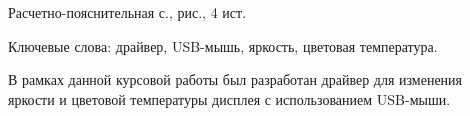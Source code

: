 
Расчетно-пояснительная \pageref{TotPages} с., \totalfigures{} рис., 4 ист.

Ключевые слова: драйвер, USB-мышь, яркость, цветовая температура.

В рамках данной курсовой работы был разработан драйвер для изменения яркости и цветовой температуры дисплея с использованием USB-мыши.

